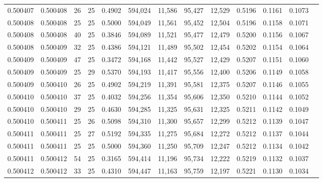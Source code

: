 \begin{tabular}{rrrrrrrrrrrrr}
0.500407 & 0.500408 &    26 &  25 &                                     0.4902 & 594,024 &  11,586 &  95,427 &  12,529 & 0.5196 & 0.1161 & 0.1073 \\
0.500408 & 0.500408 &    25 &  25 &                                     0.5000 & 594,049 &  11,561 &  95,452 &  12,504 & 0.5196 & 0.1158 & 0.1071 \\
0.500408 & 0.500408 &    40 &  25 &                                     0.3846 & 594,089 &  11,521 &  95,477 &  12,479 & 0.5200 & 0.1156 & 0.1067 \\
0.500408 & 0.500409 &    32 &  25 &                                     0.4386 & 594,121 &  11,489 &  95,502 &  12,454 & 0.5202 & 0.1154 & 0.1064 \\
0.500409 & 0.500409 &    47 &  25 &                                     0.3472 & 594,168 &  11,442 &  95,527 &  12,429 & 0.5207 & 0.1151 & 0.1060 \\
0.500409 & 0.500409 &    25 &  29 &                                     0.5370 & 594,193 &  11,417 &  95,556 &  12,400 & 0.5206 & 0.1149 & 0.1058 \\
0.500409 & 0.500410 &    26 &  25 &                                     0.4902 & 594,219 &  11,391 &  95,581 &  12,375 & 0.5207 & 0.1146 & 0.1055 \\
0.500410 & 0.500410 &    37 &  25 &                                     0.4032 & 594,256 &  11,354 &  95,606 &  12,350 & 0.5210 & 0.1144 & 0.1052 \\
0.500410 & 0.500410 &    29 &  25 &                                     0.4630 & 594,285 &  11,325 &  95,631 &  12,325 & 0.5211 & 0.1142 & 0.1049 \\
0.500410 & 0.500411 &    25 &  26 &                                     0.5098 & 594,310 &  11,300 &  95,657 &  12,299 & 0.5212 & 0.1139 & 0.1047 \\
0.500411 & 0.500411 &    25 &  27 &                                     0.5192 & 594,335 &  11,275 &  95,684 &  12,272 & 0.5212 & 0.1137 & 0.1044 \\
0.500411 & 0.500411 &    25 &  25 &                                     0.5000 & 594,360 &  11,250 &  95,709 &  12,247 & 0.5212 & 0.1134 & 0.1042 \\
0.500411 & 0.500412 &    54 &  25 &                                     0.3165 & 594,414 &  11,196 &  95,734 &  12,222 & 0.5219 & 0.1132 & 0.1037 \\
0.500412 & 0.500412 &    33 &  25 &                                     0.4310 & 594,447 &  11,163 &  95,759 &  12,197 & 0.5221 & 0.1130 & 0.1034 \\

\end{tabular}
